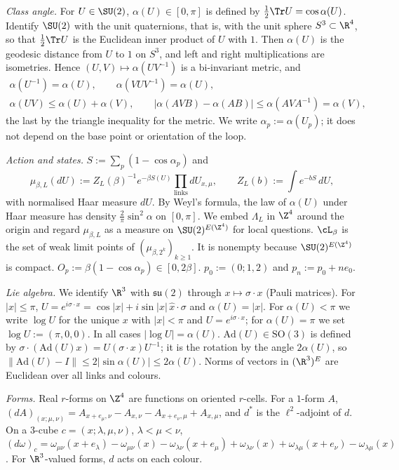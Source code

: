 \emph{Class angle.} For $U\in\SU(2)$, $\alpha(U)\in[0,\pi]$ is defined by $\tfrac12\Tr U=\cos\alpha(U)$.
Identify $\SU(2)$ with the unit quaternions, that is, with the unit sphere $S^3\subset\R^4$, so that $\tfrac12\Tr U$ is the Euclidean inner product of $U$ with $1$. Then $\alpha(U)$ is the geodesic distance from $U$ to $1$ on $S^3$, and left and right multiplications are isometries. Hence $(U,V)\mapsto\alpha(UV^{-1})$ is a bi-invariant metric, and
\begin{equation}\label{pf:eq-alpha}
\begin{gathered}
\alpha(U^{-1})=\alpha(U),\qquad \alpha(VUV^{-1})=\alpha(U),\\
\alpha(UV)\le\alpha(U)+\alpha(V),\qquad |\alpha(AVB)-\alpha(AB)|\le\alpha(AVA^{-1})=\alpha(V),
\end{gathered}
\end{equation}
the last by the triangle inequality for the metric.
We write $\alpha_p:=\alpha(U_p)$; it does not depend on the base point or orientation of the loop.

\emph{Action and states.} $S:=\sum_p(1-\cos\alpha_p)$ and
\[
\mu_{\beta,L}(dU):=Z_L(\beta)^{-1}e^{-\beta S(U)}\prod_{\text{links}}dU_{x,\mu},\qquad Z_L(b):=\int e^{-bS}\,dU,
\]
with normalised Haar measure $dU$. By Weyl's formula, the law of $\alpha(U)$ under Haar measure has density $\tfrac2\pi\sin^2\alpha$ on $[0,\pi]$.
We embed $\Lambda_L$ in $\Z^4$ around the origin and regard $\mu_{\beta,L}$ as a measure on $\SU(2)^{E(\Z^4)}$ for local questions.
$\cL_\beta$ is the set of weak limit points of $(\mu_{\beta,2^k})_{k\ge1}$. It is nonempty because $\SU(2)^{E(\Z^4)}$ is compact.
$O_p:=\beta(1-\cos\alpha_p)\in[0,2\beta]$. $p_0:=(0;1,2)$ and $p_n:=p_0+ne_0$.

\emph{Lie algebra.} We identify $\R^3$ with $\mathfrak{su}(2)$ through $x\mapsto\sigma\cdot x$ (Pauli matrices). For $|x|\le\pi$, $U=e^{i\sigma\cdot x}=\cos|x|+i\sin|x|\,\hat x\cdot\sigma$ and $\alpha(U)=|x|$. For $\alpha(U)<\pi$ we write $\log U$ for the unique $x$ with $|x|<\pi$ and $U=e^{i\sigma\cdot x}$; for $\alpha(U)=\pi$ we set $\log U:=(\pi,0,0)$. In all cases $|\log U|=\alpha(U)$. $\mathrm{Ad}(U)\in\mathrm{SO}(3)$ is defined by $\sigma\cdot(\mathrm{Ad}(U)x)=U(\sigma\cdot x)U^{-1}$; it is the rotation by the angle $2\alpha(U)$, so $\|\mathrm{Ad}(U)-I\|\le2|\sin\alpha(U)|\le2\alpha(U)$.
Norms of vectors in $(\R^3)^E$ are Euclidean over all links and colours.

\emph{Forms.} Real $r$-forms on $\Z^4$ are functions on oriented $r$-cells. For a $1$-form $A$, $(dA)_{(x;\mu,\nu)}=A_{x+e_\mu,\nu}-A_{x,\nu}-A_{x+e_\nu,\mu}+A_{x,\mu}$, and $d^*$ is the $\ell^2$-adjoint of $d$. On a $3$-cube $c=(x;\lambda,\mu,\nu)$, $\lambda<\mu<\nu$,
$(d\omega)_c=\omega_{\mu\nu}(x+e_\lambda)-\omega_{\mu\nu}(x)-\omega_{\lambda\nu}(x+e_\mu)+\omega_{\lambda\nu}(x)+\omega_{\lambda\mu}(x+e_\nu)-\omega_{\lambda\mu}(x)$.
For $\R^3$-valued forms, $d$ acts on each colour.

